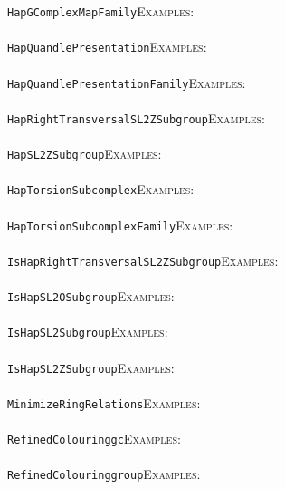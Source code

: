 \documentclass[a4paper,11pt]{report}
\begin{document}
{{ \texttt{HapGComplexMapFamily}{\nobreakspace}{\nobreakspace}{\nobreakspace}{\nobreakspace}\textsc{Examples:} \\
 \\
 \texttt{HapQuandlePresentation}{\nobreakspace}{\nobreakspace}{\nobreakspace}{\nobreakspace}\textsc{Examples:} \\
 \\
 \texttt{HapQuandlePresentationFamily}{\nobreakspace}{\nobreakspace}{\nobreakspace}{\nobreakspace}\textsc{Examples:} \\
 \\
 \texttt{HapRightTransversalSL2ZSubgroup}{\nobreakspace}{\nobreakspace}{\nobreakspace}{\nobreakspace}\textsc{Examples:} \\
 \\
 \texttt{HapSL2ZSubgroup}{\nobreakspace}{\nobreakspace}{\nobreakspace}{\nobreakspace}\textsc{Examples:} \\
 \\
 \texttt{HapTorsionSubcomplex}{\nobreakspace}{\nobreakspace}{\nobreakspace}{\nobreakspace}\textsc{Examples:} \\
 \\
 \texttt{HapTorsionSubcomplexFamily}{\nobreakspace}{\nobreakspace}{\nobreakspace}{\nobreakspace}\textsc{Examples:} \\
 \\
 \texttt{IsHapRightTransversalSL2ZSubgroup}{\nobreakspace}{\nobreakspace}{\nobreakspace}{\nobreakspace}\textsc{Examples:} \\
 \\
 \texttt{IsHapSL2OSubgroup}{\nobreakspace}{\nobreakspace}{\nobreakspace}{\nobreakspace}\textsc{Examples:} \\
 \\
 \texttt{IsHapSL2Subgroup}{\nobreakspace}{\nobreakspace}{\nobreakspace}{\nobreakspace}\textsc{Examples:} \\
 \\
 \texttt{IsHapSL2ZSubgroup}{\nobreakspace}{\nobreakspace}{\nobreakspace}{\nobreakspace}\textsc{Examples:} \\
 \\
 \texttt{MinimizeRingRelations}{\nobreakspace}{\nobreakspace}{\nobreakspace}{\nobreakspace}\textsc{Examples:} \\
 \\
 \texttt{RefinedColouring{\textunderscore}gc}{\nobreakspace}{\nobreakspace}{\nobreakspace}{\nobreakspace}\textsc{Examples:} \\
 \\
 \texttt{RefinedColouring{\textunderscore}group}{\nobreakspace}{\nobreakspace}{\nobreakspace}{\nobreakspace}\textsc{Examples:} \\
}}
\end{document}
